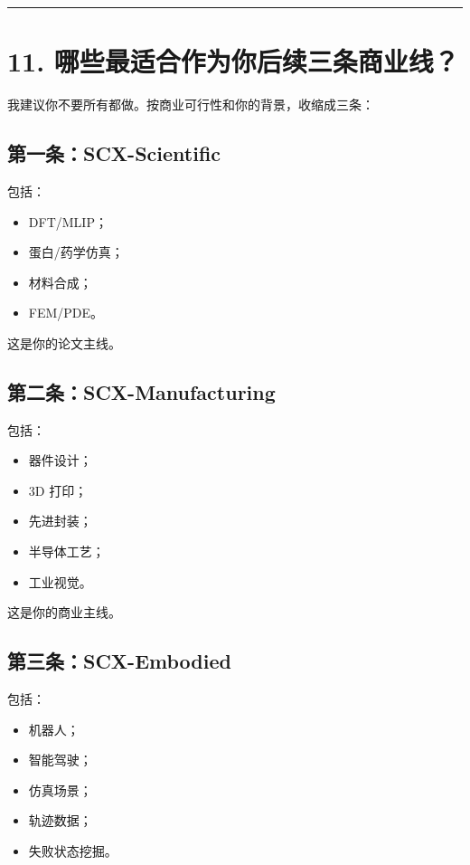 \documentclass[
  12pt,
]{ctexart}
\providecommand{\tightlist}{%
  \setlength{\itemsep}{0pt}\setlength{\parskip}{0pt}}
\begin{document}
\begin{center}\rule{0.5\linewidth}{0.5pt}\end{center}

\section{11.
哪些最适合作为你后续三条商业线？}\label{ux54eaux4e9bux6700ux9002ux5408ux4f5cux4e3aux4f60ux540eux7eedux4e09ux6761ux5546ux4e1aux7ebf}

我建议你不要所有都做。按商业可行性和你的背景，收缩成三条：

\subsection{第一条：SCX-Scientific}\label{ux7b2cux4e00ux6761scx-scientific}

包括：

\begin{itemize}
\tightlist
\item
  DFT/MLIP；
\item
  蛋白/药学仿真；
\item
  材料合成；
\item
  FEM/PDE。
\end{itemize}

这是你的论文主线。

\subsection{第二条：SCX-Manufacturing}\label{ux7b2cux4e8cux6761scx-manufacturing}

包括：

\begin{itemize}
\tightlist
\item
  器件设计；
\item
  3D 打印；
\item
  先进封装；
\item
  半导体工艺；
\item
  工业视觉。
\end{itemize}

这是你的商业主线。

\subsection{第三条：SCX-Embodied}\label{ux7b2cux4e09ux6761scx-embodied}

包括：

\begin{itemize}
\tightlist
\item
  机器人；
\item
  智能驾驶；
\item
  仿真场景；
\item
  轨迹数据；
\item
  失败状态挖掘。
\end{itemize}
\end{document}
